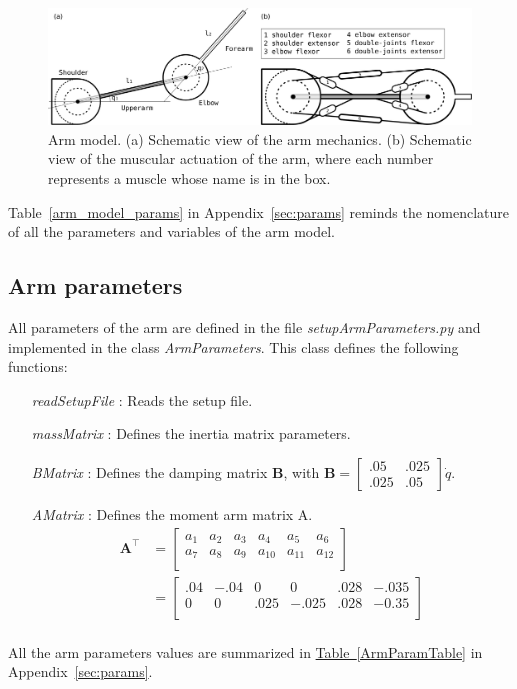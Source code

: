 \documentclass[pdftex,a4paper,11pt]{report}
\begin{document}
\begin{figure}[hbt]
\centering
	\includegraphics[width=0.9\columnwidth]{figures/arm_model_horiz.pdf}
	\caption{Arm model. (a) Schematic view of the arm mechanics. (b) Schematic view of the muscular actuation of the arm, where each number represents a muscle whose name is in the box.}
	\label{fig:arm_model}
\end{figure}

Table~\ref{arm_model_params} in Appendix~\ref{sec:params} reminds the nomenclature of all the parameters and variables of the arm model. 

\subsection{Arm parameters}
\label{sec:arm_parameters}
All parameters of the arm are defined in the file \textit{setupArmParameters.py} and implemented in the class \textit{ArmParameters}.
This class defines the following functions:
\begin{itemize}
\item[\textit{readSetupFile}]: Reads the setup file.
\item[\textit{massMatrix}]: Defines the inertia matrix parameters.
\item[\textit{BMatrix}]: Defines the damping matrix \textbf{B}, with
$\textbf{B} = \begin{bmatrix}
           .05 & .025 \\
          .025 & .05
     \end{bmatrix} \dot{q}.$\\
\item[\textit{AMatrix}]: Defines the moment arm matrix A.
\begin{align*}
  \textbf{A}^\top        & = \begin{bmatrix}
    a_{1} & a_{2} & a_{3} & a_{4} & a_{5} & a_{6} \\
    a_{7} & a_{8} & a_{9} & a_{10} & a_{11} & a_{12} \\
  \end{bmatrix} \\
  & = \begin{bmatrix}
    .04 & -.04 &    0 &     0 & .028 & -.035 \\
    0 &    0 & .025 & -.025 & .028 & -0.35 \\
  \end{bmatrix}\\
\end{align*}
\end{itemize}
All the arm parameters values are summarized in \hyperref[ArmParamTable]{Table~\ref{ArmParamTable}} in Appendix~\ref{sec:params}.
\end{document}
